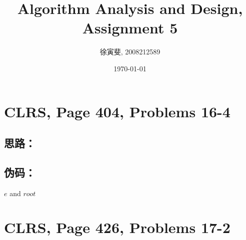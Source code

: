 \documentclass{article}
\begin{document}
\begin{CJK}{UTF8}{gbsn}
\title{Algorithm Analysis and Design, Assignment 5}
\author{徐寅斐, 2008212589}
\date{\today}
\maketitle

\section{CLRS, Page 404, Problems 16-4}

\subsection*{思路：}

\subsection*{伪码：}

\begin{codebox}
\li \Return $e$ and $root$
\end{codebox}

\section{CLRS, Page 426, Problems 17-2}

\end{CJK}
\end{document}
